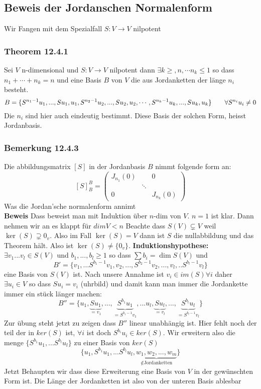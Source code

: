 \documentclass{article}
\newcommand{\mspc}{\hspace{0.7cm}}
\newcommand{\beweis}{\\\textbf{Beweis }}
\newcommand{\bemerkung}[1]{\subsubsection*{Bemerkung {#1}}}
\newcommand{\theorem}[1]{\subsubsection*{Theorem {#1}}}
\begin{document}
\subsection*{Beweis der Jordanschen Normalenform}
Wir Fangen mit dem Spezialfall $S:V\rightarrow V$ nilpotent
\theorem{12.4.1} Sei $V$ n-dimensional und $S:V\rightarrow V$ nilpotent dann $\exists k \ge , n, \cdots n_k \le 1$ so dass $n_1+\cdots+n_k=n$ und eine Basis $B$ von $V$ die aus Jordanketten der länge $n_i$ besteht. 
\[B=\lbrace S^{n_1-1}u_1, ..., Su_1, u_1, S^{n_2-1}u_2,..., Su_2, u_2,\cdots ,S^{n_k-1}u_k,..., Su_k, u_k\rbrace \mspc \forall S^{n_i}u_i\neq 0\]
Die $n_i$ sind hier auch eindeutig bestimmt. Diese Basis der solchen Form, heisst Jordanbasis.
\bemerkung{12.4.3}Die abbildungsmatrix $[S]$ in der Jordanbasis $B$ nimmt folgende form an:\[[S]_B^B=\begin{pmatrix}J_{n_1}(0)& & 0\\&\ddots&\\0&&J_{n_k}(0)\end{pmatrix}\] Was die Jordan'sche normalenform annimt
\beweis Dass beweist man mit Induktion über $n$-dim von $V$. $n=1$ ist klar. Dann nehmen wir an es klappt für $dim V<n$ Beachte dass $S(V)\subsetneq V$ weil $\ker(S)\supsetneq 0_v$. Also im Fall $\ker(S)=V$ dann ist $S$ die nullabbildung und das Theorem hält.
Also ist $\ker(S)\neq\lbrace 0_v\rbrace$. \newline
\textbf{Induktionshypothese:} $\exists v_1 ... v_l\in S(V)$ und $b_1, ... ,b_l\ge1$ so dass $\sum b_i=\dim S(V)$ und \[B'=\lbrace v_1, ... S^{b_1-1}v_1, v_2,...,S^{b_2-1}v_2,...,v_l,..S^{b_l -1}v_l\rbrace\]
eine Basis von $S(V)$ ist. Nach unsere Annahme ist $v_i\in im(S)\forall i$ daher $\exists u_i\in V$ so dass $Su_i=v_i$ (uhrbild) und damit kann man immer die Jordankette immer ein stück länger machen:
\[B''=\lbrace u_1, \underset{=v_1}{\underbrace{Su_1}},...,\underset{=S^{b_1-1}v_1}{\underbrace{S^{b_1}u_1}},...u_l,\underset{=v_l}{\underbrace{Su_l}},...,\underset{=S^{b_l-1}v_l}{\underbrace{S^{b_l}u_l}} \rbrace \]
Zur übung steht jetzt zu zeigen dass $B''$ linear unabhängig ist. Hier fehlt noch der teil der in $ker(S)$ ist, $\forall i$ ist doch $ S^{b_i}u_i\in ker(S)$. Wir erweitern also die menge $\lbrace S^{b_1}u_1,...S^{b_l}u_l\rbrace$ zu einer Basis von $ker(S)$ 
\[\lbrace u_1, S^{b_1}u_1,...S^{b_l}u_l, \underset{\notin\text{Jordanketten}}{\underbrace{w_1, w_2, ..., w_m}}\rbrace\]
Jetzt Behaupten wir dass diese Erweiterung eine Basis von $V$ in der gewünschten Form ist. Die Länge der Jordanketten ist also von der unteren Basis ablesbar
\end{document}
